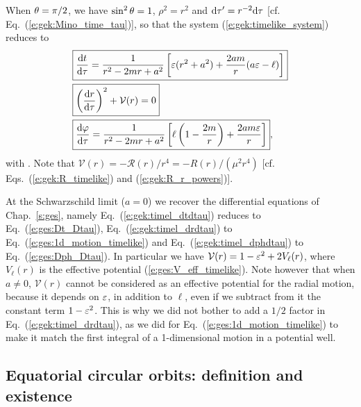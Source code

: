 When $\theta=\pi/2$, we have $\sin^2\theta=1$, $\rho^2 = r^2$ and $\mathrm{d}\tau' = r^{-2}\mathrm{d}\tau$
[cf. Eq.~(\ref{e:gek:Mino_time_tau})], so that the system
(\ref{e:gek:timelike_system}) reduces to
\begin{subequations}
\label{e:gek:equat_time_system}
\begin{align}
& \fbox{$\displaystyle  \frac{\mathrm{d} t}{\mathrm{d}\tau} = \frac{1}{r^2 - 2 m r + a^2} \left[
    \varepsilon(r^2 + a^2) + \frac{2 a m}{r} (a\varepsilon - \ell) \right] $} \label{e:gek:timel_dtdtau} \\
& \fbox{$\displaystyle  \left( \frac{\mathrm{d} r}{\mathrm{d} \tau} \right) ^2 + \mathcal{V}(r) = 0 $}\label{e:gek:timel_drdtau} \\
& \fbox{$\displaystyle  \frac{\mathrm{d}\varphi}{\mathrm{d}\tau} = \frac{1}{r^2 - 2 m r + a^2} \left[
    \ell \left( 1 - \frac{2m}{r} \right)
    + \frac{2 am \varepsilon}{r} \right] $},  \label{e:gek:timel_dphdtau}
\end{align}
\end{subequations}
with
\be \label{e:gek:def_V_time_equat}
   .
\ee
Note that $\mathcal{V}(r) = - \mathcal{R}(r)/r^4 = - R(r) / (\mu^2 r^4)$ [cf. Eqs.~(\ref{e:gek:R_timelike}) and (\ref{e:gek:R_r_powers})].
\begin{remark}
At the Schwarzschild limit ($a=0$) we recover the differential equations of Chap.~\ref{s:ges},
namely Eq.~(\ref{e:gek:timel_dtdtau}) reduces to Eq.~(\ref{e:ges:Dt_Dtau}),
Eq.~(\ref{e:gek:timel_drdtau}) to Eq.~(\ref{e:ges:1d_motion_timelike}) and
Eq.~(\ref{e:gek:timel_dphdtau}) to Eq.~(\ref{e:ges:Dph_Dtau}). In particular
we have $\mathcal{V}(r) = 1 - \varepsilon^2 + 2 V_\ell(r)$, where $V_\ell(r)$
is the effective potential (\ref{e:ges:V_eff_timelike}). Note however that
when $a\neq 0$, $\mathcal{V}(r)$ cannot be considered as an effective
potential for the radial motion, because it depends on $\varepsilon$, in addition
to $\ell$, even if we subtract from it the constant term $1 - \varepsilon^2$.
This is why we did not bother to add a $1/2$ factor in Eq.~(\ref{e:gek:timel_drdtau}),
as we did for Eq.~(\ref{e:ges:1d_motion_timelike}) to make it match
the first integral of a 1-dimensional motion in a potential well.
\end{remark}

\subsection{Equatorial circular orbits: definition and existence} \label{s:gek:existence_circ_orb}

